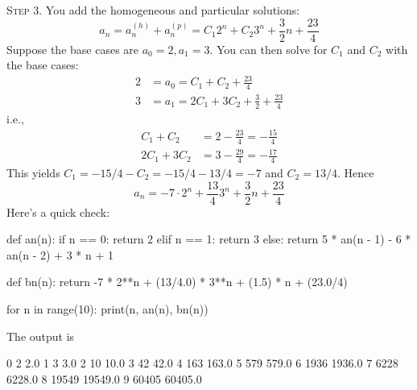 \textsc{Step 3}.
You add the homogeneous and particular solutions:
\[
a_n = a_n^{(h)} + a_n^{(p)} = C_1 2^n + C_2 3^n + \frac{3}{2}n + \frac{23}{4}  
\]
Suppose the base cases are $a_0 = 2, a_1 = 3$.
You can then solve for $C_1$ and $C_2$ with the base cases:
\begin{align*}
2 &= a_0 = C_1 + C_2 + \frac{23}{4} \\ 
3 &= a_1 = 2C_1 + 3C_2 + \frac{3}{2} + \frac{23}{4}
\end{align*}
i.e.,
\begin{align*}
C_1 + C_2 &= 2 - \frac{23}{4} = -\frac{15}{4} \\ 
2C_1 + 3C_2 &= 3 - \frac{29}{4} = -\frac{17}{4}
\end{align*}
This yields
$C_1 = -15/4 - C_2 = -15/4 - 13/4 = -7$ and $C_2 = 13/4$.
Hence
\[
a_n = -7 \cdot 2^n + \frac{13}{4} 3^n + \frac{3}{2}n + \frac{23}{4}  
\]
Here's a quick check:
\begin{console}[frame=single,fontsize=\footnotesize]
def an(n):
    if n == 0: return 2
    elif n == 1: return 3
    else: return 5 * an(n - 1) - 6 * an(n - 2) + 3 * n + 1

def bn(n):
    return -7 * 2**n + (13/4.0) * 3**n + (1.5) * n + (23.0/4)

for n in range(10):
    print(n, an(n), bn(n))
\end{console}
The output is
\begin{console}[frame=single,fontsize=\footnotesize]
0 2 2.0
1 3 3.0
2 10 10.0
3 42 42.0
4 163 163.0
5 579 579.0
6 1936 1936.0
7 6228 6228.0
8 19549 19549.0
9 60405 60405.0
\end{console}

